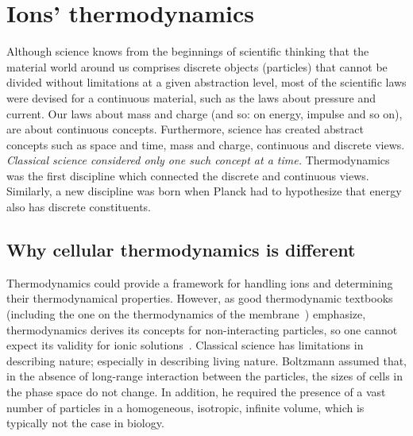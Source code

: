 
\section{Ions' thermodynamics\label{sec:Physics-Thermodynamics}}

Although science knows from the beginnings of scientific thinking that the material world around us
comprises discrete objects (particles) that cannot be divided without limitations at a given abstraction level,
most of the scientific laws were devised for a continuous material,
such as the laws about pressure and current.
Our laws about mass and charge (and so: on energy, impulse and so on),
are about continuous concepts.
Furthermore, science has created abstract concepts such as space and time, mass and charge, continuous and discrete views. \textit{Classical science considered only one such concept at a time.} Thermodynamics was the first discipline
which connected the discrete and continuous views. Similarly, a new discipline was born when Planck had to hypothesize that energy also has
discrete constituents.


\subsection[Why different]{Why cellular thermodynamics is different\label{sec:Physics-ThermodynamicsWhyDifferent}}

Thermodynamics could provide a framework for handling ions and determining their thermodynamical properties. However,
as good thermodynamic textbooks (including the one on the thermodynamics of the membrane~\cite{ThermalBiophysics:2007}) emphasize, thermodynamics
derives its concepts for non-interacting particles, so one cannot expect 
its validity for ionic solutions~\cite{VeghNon-ordinaryLaws:2025}. Classical science has limitations in describing nature;
especially in describing living nature.
Boltzmann assumed that, in the absence of long-range interaction between the particles, the sizes of cells in the phase space do not change.
In addition, he required  the presence of a vast number of particles
in a homogeneous, isotropic, infinite volume,
which is typically not the case in biology.


